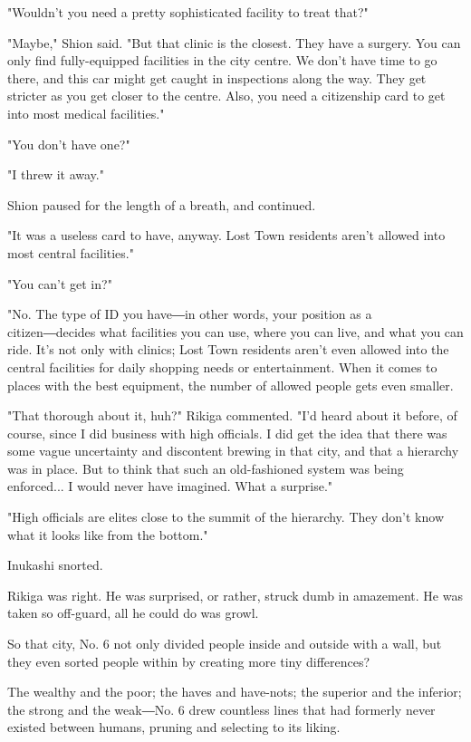 "Wouldn't you need a pretty sophisticated facility to treat that?"

"Maybe," Shion said. "But that clinic is the closest. They have a
surgery. You can only find fully-equipped facilities in the city centre.
We don't have time to go there, and this car might get caught in
inspections along the way. They get stricter as you get closer to the
centre. Also, you need a citizenship card to get into most medical
facilities."

"You don't have one?"

"I threw it away."

Shion paused for the length of a breath, and continued.

"It was a useless card to have, anyway. Lost Town residents aren't
allowed into most central facilities."

"You can't get in?"

"No. The type of ID you have―in other words, your position as a
citizen―decides what facilities you can use, where you can live, and
what you can ride. It's not only with clinics; Lost Town residents
aren't even allowed into the central facilities for daily shopping needs
or entertainment. When it comes to places with the best equipment, the
number of allowed people gets even smaller.

"That thorough about it, huh?" Rikiga commented. "I'd heard about it
before, of course, since I did business with high officials. I did get
the idea that there was some vague uncertainty and discontent brewing in
that city, and that a hierarchy was in place. But to think that such an
old-fashioned system was being enforced... I would never have imagined.
What a surprise."

"High officials are elites close to the summit of the hierarchy. They
don't know what it looks like from the bottom."

Inukashi snorted.

Rikiga was right. He was surprised, or rather, struck dumb in amazement.
He was taken so off-guard, all he could do was growl.

So that city, No. 6 not only divided people inside and outside with a
wall, but they even sorted people within by creating more tiny
differences?

The wealthy and the poor; the haves and have-nots; the superior and the
inferior; the strong and the weak―No. 6 drew countless lines that had
formerly never existed between humans, pruning and selecting to its
liking.

